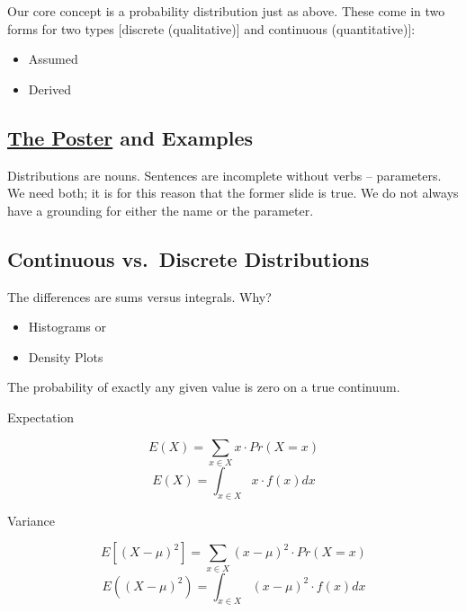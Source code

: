 \documentclass[ignorenonframetext,]{beamer}
\providecommand{\tightlist}{%
  \setlength{\itemsep}{0pt}\setlength{\parskip}{0pt}}
\begin{document}
Our core concept is a probability distribution just as above. These come
in two forms for two types {[}discrete (qualitative){]} and continuous
(quantitative){]}:

\begin{itemize}[<+->]
\tightlist
\item
  Assumed
\item
  Derived
\end{itemize}

\begin{frame}

\end{frame}

\hypertarget{the-poster-and-examples}{%
\subsection{\texorpdfstring{\href{https://github.com/robertwwalker/DADMStuff/raw/master/Distribution-Poster.pdf}{The
Poster} and
Examples}{The Poster and Examples}}\label{the-poster-and-examples}}

Distributions are nouns. Sentences are incomplete without verbs --
parameters. We need both; it is for this reason that the former slide is
true. We do not always have a grounding for either the name or the
parameter.

\begin{frame}

\end{frame}

\hypertarget{continuous-vs.discrete-distributions}{%
\subsection{Continuous vs.~Discrete
Distributions}\label{continuous-vs.discrete-distributions}}

The differences are sums versus integrals. Why?

\begin{itemize}[<+->]
\tightlist
\item
  Histograms or\\
\item
  Density Plots
\end{itemize}

The probability of exactly any given value is zero on a true continuum.

\begin{frame}

Expectation

\[E(X) = \sum_{x \in X} x \cdot Pr(X=x)\]
\[E(X) = \int_{x \in X} x \cdot f(x)dx\]

Variance

\[E[(X-\mu)^2] = \sum_{x \in X} (x-\mu)^2 \cdot Pr(X=x)\]
\[E((X-\mu)^2) = \int_{x \in X} (x-\mu)^2 \cdot f(x)dx\]

\end{frame}
\end{document}
